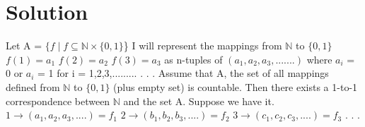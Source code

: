 \documentclass[11pt]{article}
\begin{document}
\section*{Solution}
Let A = $\{f\mid f\subseteq \mathbb{N} \times \{0,1\}$\} \newline\newline
I will represent the mappings from $\mathbb{N}$ to $\{0,1\}$  \newline \newline
$f(1) = a_1$ \newline
$f(2) = a_2$ \newline
$f(3) = a_3$ \space \space \space \space \space \space \space \space \space \space \space \space \space \space \space \space \space \space \space \space as n-tuples of $(a_1,a_2,a_3,.......)$ where $a_i$ = 0 or $a_i$ = 1 for i = 1,2,3,......... \newline
. \newline
. \newline
. \newline\newline
\noindent
Assume that A, the set of all mappings defined from $\mathbb{N}$ to $\{0,1\}$ (plus empty set) is countable. Then there exists a 1-to-1 correspondence between
$\mathbb{N}$ and the set A. \newline \newline
Suppose we have it. \newline \newline
$1 \xrightarrow{} (a_1,a_2,a_3,....) = f_1$ \newline
$2 \xrightarrow{} (b_1,b_2,b_3,....) = f_2$ \newline
$3 \xrightarrow{} (c_1,c_2,c_3,....) = f_3$ \newline
. \newline
. \newline
. \newline\newline
\end{document}
